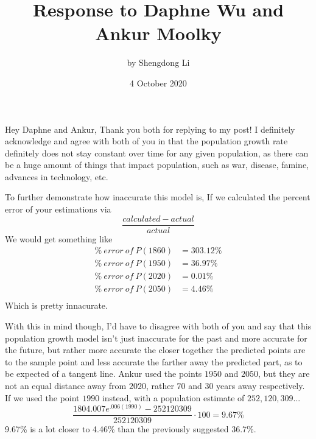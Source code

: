 \documentclass[12pt]{article}
\begin{document}
\title{Response to Daphne Wu and Ankur Moolky}
\author{by Shengdong Li}
\date{4 October 2020}
\maketitle

Hey Daphne and Ankur,
Thank you both for replying to my post! I definitely acknowledge and agree with both of you in that the population growth rate definitely does not stay constant over time for any given population, as there can be a huge amount of things that impact population, such as war, disease, famine, advances in technology, etc.

To further demonstrate how inaccurate this model is, If we calculated the percent error of your estimations via $$
  \frac{calculated-actual}{actual}
$$
We would get something like
\begin{align}
  \%\:error\:of\:P(1860) & = 303.12\% \\
  \%\:error\:of\:P(1950) & = 36.97\%  \\
  \%\:error\:of\:P(2020) & = 0.01\%   \\
  \%\:error\:of\:P(2050) & = 4.46\%   \\
\end{align}
Which is pretty innacurate.

With this in mind though, I'd have to disagree with both of you and say that this population growth model isn't just inaccurate for the past and more accurate for the future, but rather more accurate the closer together the predicted points are to the sample point and less accurate the farther away the predicted part, as to be expected of a tangent line. Ankur used the points $1950$ and $2050$, but they are not an equal distance away from $2020$, rather $70$ and $30$ years away respectively. If we used the point $1990$ instead, with a population estimate of $252,120,309$...
$$
  \frac{1804.007e^{.006\left(1990\right)}-252120309}{252120309}\cdot100=9.67\%
$$
9.67\% is a lot closer to 4.46\% than the previously suggested 36.7\%.
\end{document}
